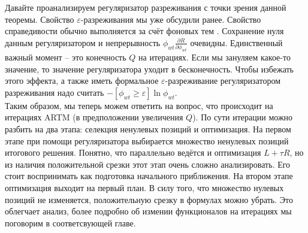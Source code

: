 \documentclass[12pt]{article}
\renewcommand{\geq}{\geqslant}
\begin{document}
Давайте проанализируем регуляризатор разреживания с точки зрения данной теоремы. Свойство $\varepsilon$-разреживания мы уже обсудили ранее. Свойство справедивости обычно выполняется за счёт фоновых тем \cite{artmdef2} . Сохранение нуля данным регуляризатором и непрерывность $\phi_{wt}\frac{\partial{R}}{\partial{\phi_{wt}}}$ очевидны. Единственный важный момент -- это конечность $Q$ на итерациях. Если мы зануляем какое-то значение, то значение регуляризатора уходит в бесконечность. Чтобы избежать этого эффекта, а также иметь формальное $\varepsilon$-разреживание регуляризатором разреживания надо считать $- [\phi_{wt} \geq \varepsilon] \ln\phi_{wt}$.\\
Таким образом, мы теперь можем ответить на вопрос, что происходит на итерациях ARTM (в предположении увеличения $Q$). По сути итерации можно разбить на два этапа: селекция ненулевых позиций и оптимизация. На первом этапе при помощи регуляризатора выбирается множество ненулевых позиций итогового решения. Понятно, что параллельно ведётся и оптимизация $L + \tau R$, но из наличия положительной срезки этот этап очень сложно анализировать. Его стоит воспринимать как подготовка начального приближения. На втором этапе оптимизация выходит на первый план. В силу того, что множество нулевых позиций не изменяется, положительную срезку в формулах можно убрать. Это облегчает анализ, более подробно об измении функционалов на итерациях мы поговорим в соответсвующей главе.
\end{document}
